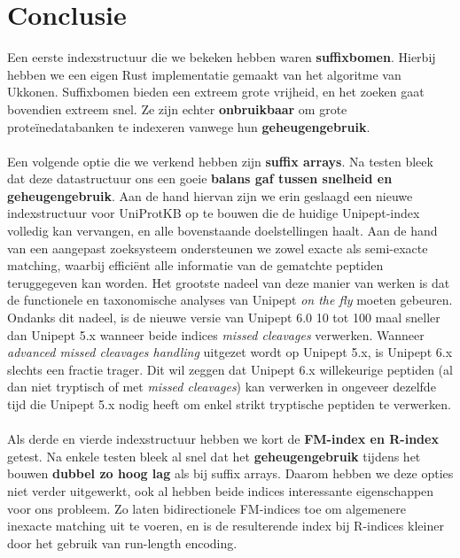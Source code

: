 \section{Conclusie}
Een eerste indexstructuur die we bekeken hebben waren \textbf{suffixbomen}.
Hierbij hebben we een eigen Rust implementatie gemaakt van het algoritme van Ukkonen.
Suffixbomen bieden een extreem grote vrijheid, en het zoeken gaat bovendien extreem snel.
Ze zijn echter \textbf{onbruikbaar} om grote proteïnedatabanken te indexeren vanwege hun \textbf{geheugengebruik}.
\\ \\
Een volgende optie die we verkend hebben zijn \textbf{suffix arrays}.
Na testen bleek dat deze datastructuur ons een goeie \textbf{balans gaf tussen snelheid en geheugengebruik}.
Aan de hand hiervan zijn we erin geslaagd een nieuwe indexstructuur voor UniProtKB op te bouwen die de huidige Unipept-index volledig kan vervangen, en alle bovenstaande doelstellingen haalt.
Aan de hand van een aangepast zoeksysteem ondersteunen we zowel exacte als semi-exacte matching, waarbij efficiënt alle informatie van de gematchte peptiden teruggegeven kan worden.
Het grootste nadeel van deze manier van werken is dat de functionele en taxonomische analyses van Unipept \textit{on the fly} moeten gebeuren.
Ondanks dit nadeel, is de nieuwe versie van Unipept 6.0 10 tot 100 maal sneller dan Unipept 5.x wanneer beide indices \textit{missed cleavages} verwerken.
Wanneer \textit{advanced missed cleavages handling} uitgezet wordt op Unipept 5.x, is Unipept 6.x slechts een fractie trager.
Dit wil zeggen dat Unipept 6.x willekeurige peptiden (al dan niet tryptisch of met \textit{missed cleavages}) kan verwerken in ongeveer dezelfde tijd die Unipept 5.x nodig heeft om enkel strikt tryptische peptiden te verwerken.
\\ \\
Als derde en vierde indexstructuur hebben we kort de \textbf{FM-index en R-index} getest.
Na enkele testen bleek al snel dat het \textbf{geheugengebruik} tijdens het bouwen \textbf{dubbel zo hoog lag} als bij suffix arrays.
Daarom hebben we deze opties niet verder uitgewerkt, ook al hebben beide indices interessante eigenschappen voor ons probleem.
Zo laten bidirectionele FM-indices toe om algemenere inexacte matching uit te voeren, en is de resulterende index bij R-indices kleiner door het gebruik van run-length encoding.

